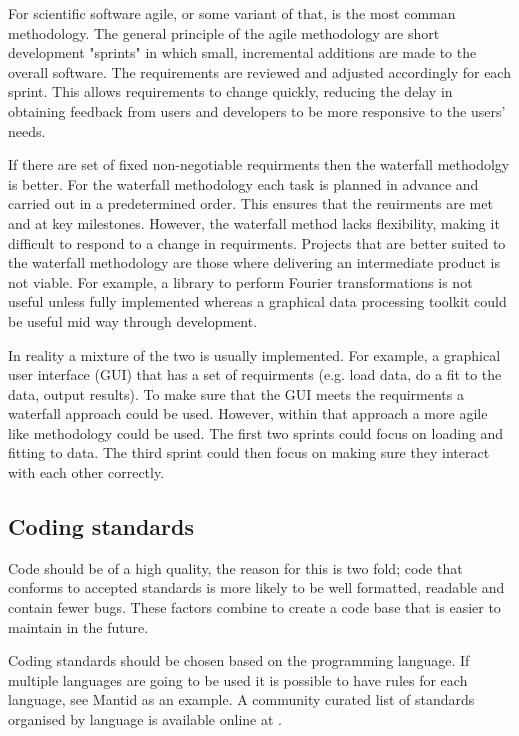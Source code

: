 \documentclass[jnr]{iosart2x}
\begin{document}
For scientific software agile, or some variant of that, is the most comman methodology.
The general principle of the agile methodology are short development "sprints" in which small, incremental additions are made to the overall software.
The requirements are reviewed and adjusted accordingly for each sprint.
This allows requirements to change quickly, reducing the delay in obtaining feedback from users and developers to be more responsive to the users' needs.

If there are set of fixed non-negotiable requirments then the waterfall methodolgy is better.
For the waterfall methodology each task is planned in advance and carried out in a predetermined order.
This ensures that the reuirments are met and at key milestones.
However, the waterfall method lacks flexibility, making it difficult to respond to a change in requirments.
Projects that are better suited to the waterfall methodology are those where delivering an intermediate product is not viable.
For example, a library to perform Fourier transformations is not useful unless fully implemented whereas a graphical data processing toolkit could be useful mid way through development.

In reality a mixture of the two is usually implemented.
For example, a graphical user interface (GUI) that has a set of requirments (e.g. load data, do a fit to the data, output results).
To make sure that the GUI meets the requirments a waterfall approach could be used.
However, within that approach a more agile like methodology could be used.
The first two sprints could focus on loading and fitting to data.
The third sprint could then focus on making sure they interact with each other correctly.

\subsection{Coding standards}
\label{Coding standards}

Code should be of a high quality, the reason for this is two fold; code that conforms to accepted standards is more likely to be well formatted, readable and contain fewer bugs.
These factors combine to create a code base that is easier to maintain in the future.

Coding standards should be chosen based on the programming language. If multiple languages are going to be used it is possible to have rules for each language, see Mantid as an example. 
A community curated list of standards organised by language is available online at \cite{Awesome_Guidelines}.
\end{document}
